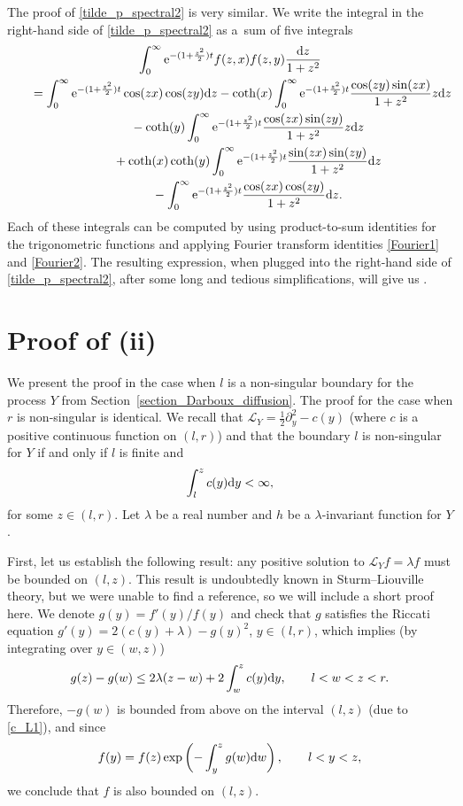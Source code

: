 \documentclass[10pt,a4paper]{amsart}
\numberwithin{equation}{section}
\theoremstyle{definition}
\def\L{{\mathcal L}}
\def\d{{\textnormal d}}
\begin{document}
The proof of \eqref{tilde_p_spectral2} is very similar. We write the integral in the right-hand side of \eqref{tilde_p_spectral2} as
a~sum of five integrals
\begin{gather*}
 \int_0^{\infty} {\rm e}^{-(1+\frac{z^2}{2}) t}
f(z,x) f(z,y) \frac{\d z}{1+z^2}\\
\qquad= \int_0^{\infty} {\rm e}^{-(1+\frac{z^2}{2}) t}
\cos(zx)\cos(zy) \d z
- \coth(x) \int_0^{\infty} {\rm e}^{-(1+\frac{z^2}{2}) t} \frac{\cos(zy) \sin(zx)}{1+z^2}z \d z\\
\phantom{\qquad= }{}- \coth(y) \int_0^{\infty} {\rm e}^{-(1+\frac{z^2}{2}) t} \frac{\cos(zx) \sin(zy)}{1+z^2} z \d z
\\
\phantom{\qquad= }{}+ \coth(x) \coth(y)
 \int_0^{\infty} {\rm e}^{-(1+\frac{z^2}{2}) t} \frac{\sin(zx) \sin(zy)}{1+z^2} \d z
\\
\phantom{\qquad= }{} -
 \int_0^{\infty} {\rm e}^{-(1+\frac{z^2}{2}) t} \frac{\cos(zx) \cos(zy)}{1+z^2} \d z.
\end{gather*}
Each of these integrals can be computed by using product-to-sum identities for the trigonometric functions and applying Fourier transform
identities \eqref{Fourier1} and \eqref{Fourier2}. The resulting expression, when plugged into the right-hand side of \eqref{tilde_p_spectral2}, after some long and tedious simplifications, will give us .


\section[Proof of (ii)]{Proof of (ii)}\label{AppendixB}

We present the proof in the case when $l$ is a non-singular boundary for the process $Y$ from Section~\ref{section_Darboux_diffusion}. The proof for the case when $r$ is non-singular is identical. We recall that $\L_Y = \frac{1}{2} \partial_y^2 - c(y)$ (where $c$ is a positive continuous function on $(l,r)$) and that the boundary $l$ is non-singular for $Y$ if and only if $l$ is finite and
\begin{equation}\label{c_L1}
\int_l^z c(y) \d y<\infty,
\end{equation}
for some $z\in (l,r)$. Let $\lambda$ be a real number and $h$ be a $\lambda$-invariant function for $Y$.

First, let us establish the following result: any positive solution to $\L_Y f=\lambda f$ must be bounded on $(l,z)$. This result is undoubtedly known in Sturm--Liouville theory, but we were unable to find a reference, so we will include a short proof here. We denote $g(y)=f'(y)/f(y)$ and check that $g$ satisfies the Riccati equation
$
g'(y)=2 (c(y)+\lambda)-g(y)^2$, $ y\in (l,r)$,
which implies (by integrating over $y\in (w,z)$)
\[
g(z)-g(w) \le 2 \lambda (z-w) + 2 \int_w^z c(y) \d y, \qquad l<w<z<r.
\]
Therefore, $-g(w)$ is bounded from above on the interval $(l,z)$ (due to \eqref{c_L1}), and since
\[
f(y)=f(z) \exp\left( -\int_y^z g(w) \d w\right), \qquad l<y<z,
\]
we conclude that $f$ is also bounded on $(l,z)$.
\end{document}
